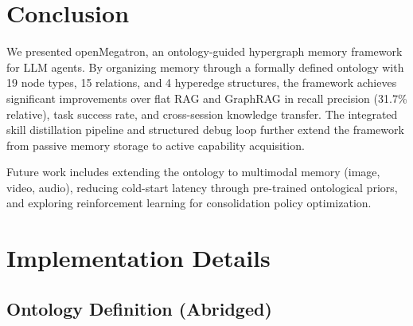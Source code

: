 \documentclass[11pt,a4paper]{article}
\begin{document}
\section{Conclusion}
\label{sec:conclusion}

We presented openMegatron, an ontology-guided hypergraph memory framework 
for LLM agents. By organizing memory through a formally defined ontology 
with 19 node types, 15 relations, and 4 hyperedge structures, 
the framework achieves significant improvements over flat RAG and GraphRAG 
in recall precision (31.7\% relative), task success rate, and cross-session 
knowledge transfer. The integrated skill distillation pipeline and structured 
debug loop further extend the framework from passive memory storage to 
active capability acquisition.

Future work includes extending the ontology to multimodal memory 
(image, video, audio), reducing cold-start latency through pre-trained 
ontological priors, and exploring reinforcement learning for 
consolidation policy optimization.




\appendix

\section{Implementation Details}

\subsection{Ontology Definition (Abridged)}
\end{document}
